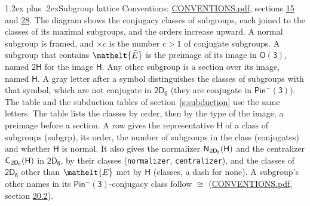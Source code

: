 \documentclass[10pt,a4paper]{article}
\makeatletter
\renewcommand\section{\@startsection{section}{1}{\z@}{-3ex plus -1ex minus -.2ex}%
  {1.2ex plus .2ex}{\normalfont\large\sffamily\bfseries\color{parttitle}}}
\numberwithin{equation}{section}
\newcommand{\eltfont}[1]{{\let\sigma\eltsigma\mathelt{#1}}}
\newcommand{\grp}[1]{\mathsf{#1}}
\newcommand{\cls}[1]{\eltfont{#1}}
\newcommand{\elt}[1]{\eltfont{#1}}
\newcommand{\samecls}{\cong}
\newcommand{\barred}[1]{\bar{#1}}
\newcommand{\hairsp}{\mkern1mu}
\makeatother
\begin{document}
\section{Subgroup lattice}\label{s:subgroups}
Conventions: \href{../../CONVENTIONS.pdf}{CONVENTIONS.pdf}, sections \href{../../../rotation/CONVENTIONS.pdf\#conv.15}{15} and \href{../../CONVENTIONS.pdf\#conv.28}{28}.
The diagram shows the conjugacy classes of subgroups, each joined to the classes of its maximal subgroups, and the orders increase upward. A normal subgroup is framed, and ${\times}c$ is the number $c > 1$ of conjugate subgroups. \label{n:group.H}A subgroup that contains $\elt{\barred{E}}$ is the preimage of its image in $\grp{O(3)}$, named $\grp{2H}$ for the image $\grp{H}$. Any other subgroup is a section over its image, named $\grp{H}$. \label{n:mark.letter}A gray letter after a symbol distinguishes the classes of subgroups with that symbol, which are not conjugate in $\grp{2D_{6}}$ (they are conjugate in \href{Pinminus3.pdf}{$\grp{Pin^{-}(3)}$}). The table and the subduction tables of section~\ref{s:subduction} use the same letters. The table lists the classes by order, then by the type of the image, a preimage before a section. \label{n:head.subgroup}\label{n:head.order}\label{n:head.conjugates}\label{n:head.normal}A row gives the representative $\grp{H}$ of a class of subgroups (subgrp), its order, the number of subgroups in the class (conjugates) and whether $\grp{H}$ is normal. \label{n:group.normalizer}\label{n:group.centralizer}\label{n:head.classes}It also gives the normalizer $\grp{N}_{\hairsp \grp{2D_{6}}}(\grp{H})$ and the centralizer $\grp{C}_{\hairsp \grp{2D_{6}}}(\grp{H})$ in $\grp{2D_{6}}$, by their classes (\texttt{normalizer}, \texttt{centralizer}), and the classes of $\grp{2D_{6}}$ other than $\cls{E}$ met by $\grp{H}$ (classes, a dash for none). A subgroup's other names in its \href{Pinminus3.pdf}{$\grp{Pin^{-}(3)}$}-conjugacy class follow $\samecls$ (\href{../../CONVENTIONS.pdf}{CONVENTIONS.pdf}, section \href{../../CONVENTIONS.pdf\#conv.20.2}{20.2}).
\end{document}
